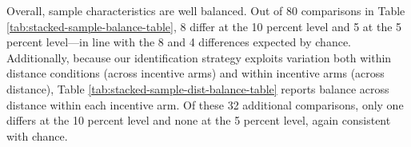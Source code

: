 \documentclass[12pt,a4paper]{article}
\begin{document}
Overall, sample characteristics are well balanced. Out of 80 comparisons in Table \ref{tab:stacked-sample-balance-table}, 8 differ at the 10 percent level and 5 at the 5 percent level---in line with the 8 and 4 differences expected by chance. Additionally, because our identification strategy exploits variation both within distance conditions (across incentive arms) and within incentive arms (across distance), Table \ref{tab:stacked-sample-dist-balance-table} reports balance across distance within each incentive arm.  Of these 32 additional comparisons, only one differs at the 10 percent level and none at the 5 percent level, again consistent with chance.




\end{document}
